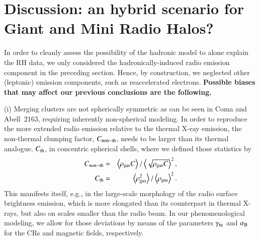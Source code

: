 \documentclass[useAMS,usenatbib]{mn2e}
\newcommand{\expval}[1]{\left\langle #1 \right\rangle}
\begin{document}
\section{Discussion: an hybrid scenario for Giant and Mini Radio Halos?}
\label{sec:discussion_hadronic}

In order to cleanly assess the possibility of the hadronic model to alone
explain the RH data, we only considered the hadronically-induced radio 
emission component in the preceding section. Hence, by construction, we 
neglected other (leptonic) emission components, such as reaccelerated electrons. 
{\bf Possible biases that may affect our previous conclusions are the following.}

(i) Merging clusters are not spherically symmetric as can be seen in Coma and
  Abell~2163, requiring inherently non-spherical modeling. In order to
  reproduce the more extended radio emission relative to the thermal X-ray
  emission, the non-thermal clumping factor, $C_{{\mathrm{non-th}}}$, needs to be
  larger than its thermal analogue, $C_{{\mathrm{th}}}$, in concentric spherical
  shells, where we defined those statistics by
  \begin{eqnarray}
    \label{eq:clumping}
    C_{\rmn{non-th}} &=&
    \expval{\rho_\rmn{gas} C}/\expval{\sqrt{\rho_\rmn{gas} C}}^2,\\
    C_{\rmn{th}} &=& 
    \expval{\rho_\rmn{gas}^2}/\expval{\rho_\rmn{gas}}^2.
  \end{eqnarray}
  This manifests itself, e.g., in the large-scale morphology of the radio
  surface brightness emission, which is more elongated than its counterpart in
  thermal X-rays, but also on scales smaller than the radio beam. In our
  phenomenological modeling, we allow for those deviations by means of the
  parameters $\gamma_{{\mathrm{tu}}}$ and $ \alpha_{{\mathrm{B}}}$ for the CRs and magnetic fields,
  respectively. 
\end{document}
